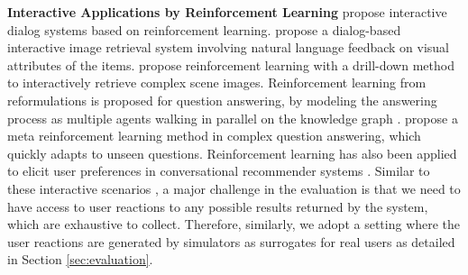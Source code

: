 \noindent\textbf{Interactive Applications by Reinforcement Learning}
\citet{liu2018dialogue,takanobu2020multi} propose interactive dialog systems based on reinforcement learning.
\citet{guo2018dialog} propose a dialog-based interactive image retrieval system involving natural language feedback on visual attributes of the items.
\citet{tan2019drill} propose reinforcement learning with a drill-down method to interactively retrieve complex scene images.
Reinforcement learning from reformulations is proposed for question answering, by modeling the answering process as multiple agents walking in parallel on the knowledge graph \cite{kaiser2021reinforcement}.  \citet{hua2020few} propose
a meta reinforcement learning method in complex question answering, which quickly adapts to unseen questions. 
Reinforcement learning has also been applied to elicit user preferences in conversational recommender systems \cite{christakopoulou2016towards, zhang2020conversational,lei2020interactive}. Similar to these interactive scenarios \cite{guo2018dialog,yu2019visual,takanobu2020multi}, a major challenge in the evaluation is that we need to have access to user reactions to any possible results returned by the system, which are exhaustive to collect. Therefore, similarly, we adopt a setting where the user reactions are generated by simulators as surrogates for real users as detailed in Section \ref{sec:evaluation}.


